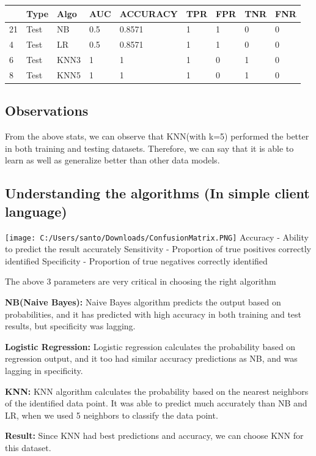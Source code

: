 \documentclass[
]{article}
\begin{document}
\begin{table}[H]
\centering
\begin{tabular}[t]{l|l|l|l|l|l|l|l|l}
\hline
  & Type & Algo & AUC & ACCURACY & TPR & FPR & TNR & FNR\\
\hline
21 & Test & NB & 0.5 & 0.8571 & 1 & 1 & 0 & 0\\
\hline
4 & Test & LR & 0.5 & 0.8571 & 1 & 1 & 0 & 0\\
\hline
6 & Test & KNN3 & 1 & 1 & 1 & 0 & 1 & 0\\
\hline
8 & Test & KNN5 & 1 & 1 & 1 & 0 & 1 & 0\\
\hline
\end{tabular}
\end{table}

\hypertarget{observations}{%
\subsection{Observations}\label{observations}}

From the above stats, we can observe that KNN(with k=5) performed the
better in both training and testing datasets. Therefore, we can say that
it is able to learn as well as generalize better than other data models.

\hypertarget{understanding-the-algorithms-in-simple-client-language}{%
\subsection{Understanding the algorithms (In simple client
language)}\label{understanding-the-algorithms-in-simple-client-language}}

\texttt{[image: C:/Users/santo/Downloads/ConfusionMatrix.PNG]} Accuracy
- Ability to predict the result accurately Sensitivity - Proportion of
true positives correctly identified Specificity - Proportion of true
negatives correctly identified

The above 3 parameters are very critical in choosing the right algorithm

\textbf{NB(Naive Bayes):} Naive Bayes algorithm predicts the output
based on probabilities, and it has predicted with high accuracy in both
training and test results, but specificity was lagging.

\textbf{Logistic Regression:} Logistic regression calculates the
probability based on regression output, and it too had similar accuracy
predictions as NB, and was lagging in specificity.

\textbf{KNN:} KNN algorithm calculates the probability based on the
nearest neighbors of the identified data point. It was able to predict
much accurately than NB and LR, when we used 5 neighbors to classify the
data point.

\textbf{Result:} Since KNN had best predictions and accuracy, we can
choose KNN for this dataset.
\end{document}
